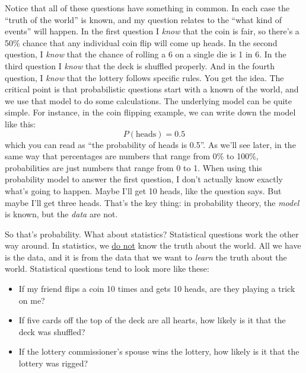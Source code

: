 \noindent
Notice that all of these questions have something in common. In each case the ``truth of the world'' is known, and my question relates to the ``what kind of events'' will happen. In the first question I {\it know} that the coin is fair, so there's a 50\% chance that any individual coin flip will come up heads. In the second question, I {\it know} that the chance of rolling a 6 on a single die is 1 in 6. In the third question I {\it know} that the deck is shuffled properly. And in the fourth question, I {\it know} that the lottery follows specific rules. You get the idea. The critical point is that probabilistic questions start with a known  of the world, and we use that model to do some calculations. The underlying model can be quite simple. For instance, in the coin flipping example, we can write down the model like this:
$$
P(\mbox{heads}) = 0.5
$$
which you can read as ``the probability of heads is 0.5''. As we'll see later, in the same way that percentages are numbers that range from 0\% to 100\%, probabilities are just numbers that range from 0 to 1. When using this probability model to answer the first question, I don't actually know exactly what's going to happen. Maybe I'll get 10 heads, like the question says. But maybe I'll get three heads. That's the key thing: in probability theory, the {\it model} is known, but the {\it data} are not.

So that's probability. What about statistics? Statistical questions work the other way around. In statistics, we \underline{do not} know the truth about the world. All we have is the data, and it is from the data that we want to {\it learn} the truth about the world. Statistical questions tend to look more like these:
\begin{itemize} \itemsep -2pt
\item If my friend flips a coin 10 times and gets 10 heads, are they playing a trick on me?
\item If five cards off the top of the deck are all hearts, how likely is it that the deck was shuffled? 
\item If the lottery commissioner's spouse wins the lottery, how likely is it that the lottery was rigged?
\end{itemize}

